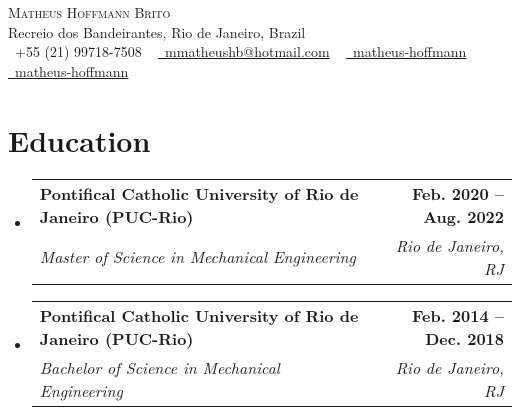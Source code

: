 \documentclass[letterpaper,11pt]{article}
\makeatletter
\newcommand{\resumeSubheading}[4]{
  \vspace{-2pt}\item
    \begin{tabular*}{1.0\textwidth}[t]{l@{\extracolsep{\fill}}r}
      \textbf{#1} & \textbf{\small #2} \\
      \textit{\small#3} & \textit{\small #4} \\
    \end{tabular*}\vspace{-7pt}
}
\newcommand{\resumeSubHeadingListStart}{\begin{itemize}[leftmargin=0.0in, label={}]}
\newcommand{\resumeSubHeadingListEnd}{\end{itemize}}
\makeatother
\begin{document}

\begin{center}
    {\Huge \scshape Matheus Hoffmann Brito} \\ \vspace{1pt}
    Recreio dos Bandeirantes, Rio de Janeiro, Brazil \\ \vspace{1pt}
    \small \raisebox{-0.1\height}\faPhone\ +55 (21) 99718-7508 ~ \href{mailto:mmatheushb@hotmail.com}{\raisebox{-0.2\height}\faEnvelope\  \underline{mmatheushb@hotmail.com}} ~ 
    \href{https://linkedin.com/in/matheus-hoffmann}{\raisebox{-0.2\height}\faLinkedin\ \underline{matheus-hoffmann}}  ~
    \href{https://github.com/matheus-hoffmann}{\raisebox{-0.2\height}\faGithub\ \underline{matheus-hoffmann}}
    \vspace{-8pt}
\end{center}


\section{Education}
\resumeSubHeadingListStart
\resumeSubheading
{Pontifical Catholic University of Rio de Janeiro (PUC-Rio)}{Feb. 2020 -- Aug. 2022}
{Master of Science in Mechanical Engineering}{Rio de Janeiro, RJ}
\resumeSubheading
{Pontifical Catholic University of Rio de Janeiro (PUC-Rio)}{Feb. 2014 -- Dec. 2018}
{Bachelor of Science in Mechanical Engineering}{Rio de Janeiro, RJ}
\resumeSubHeadingListEnd


\end{document}
